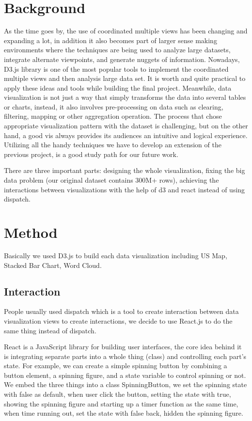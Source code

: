 
\testfigure


\section{Background}
As the time goes by, the use of coordinated multiple views has been changing and expanding a lot, in addition it also becomes part of larger sense making environments where the techniques are being used to analyze large datasets, integrate alternate viewpoints, and generate nuggets of information.\cite{roberts2007state} Nowadays, D3.js library is one of the most popular tools to implement the coordinated multiple views and then analysis large data set. It is worth and quite practical to apply these ideas and tools while building the final project. Meanwhile, data visualization is not just a way that simply transforms the data into several tables or charts, instead, it also involves pre-processing on data such as clearing, filtering, mapping or other aggregation operation. The process that chose appropriate visualization pattern with the dataset is challenging, but on the other hand, a good vis always provides its audiences an intuitive and logical experience. Utilizing all the handy techniques we have to develop an extension of the previous project, is a good study path for our future work.

There are three important parts: designing the whole visualization, fixing the big data problem (our original dataset contains 300M+ rows), achieving the interactions between visualizations with the help of d3 and react instead of using dispatch.

\section{Method}

Basically we used D3.js to build each data visualization including US Map, Stacked Bar Chart, Word Cloud. 

\subsection{Interaction}
People usually used dispatch which is a tool to create interaction between data visualization views to create interactions, we decide to use React.js to do the same thing instead of dispatch.

React is a JavaScript library for building user interfaces, the core idea behind it is integrating separate parts into a whole thing (class) and controlling each part's state. For example, we can create a simple spinning button by combining a button element, a spinning figure, and a state variable to control spinning or not. We embed the three things into a class SpinningButton, we set the spinning state with false as default, when user click the button, setting the state with true, showing the spinning figure and starting up a timer function as the same time, when time running out, set the state with false back, hidden the spinning figure. 

